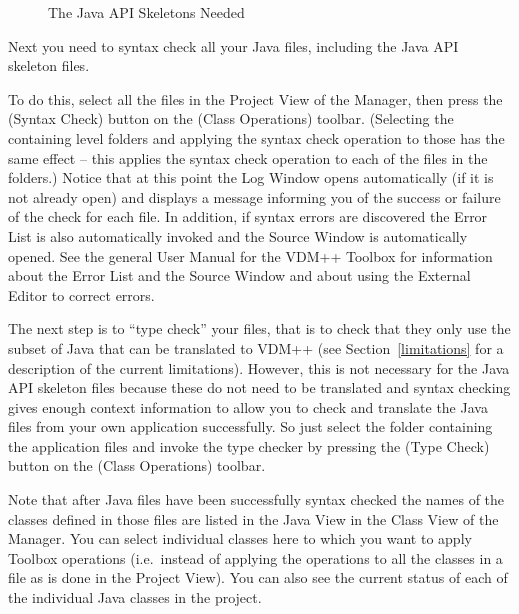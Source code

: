 \documentclass[\pformat,12pt]{article}
\newcommand{\guicmd}[1]{{\sf #1}}
\begin{document}
\begin{figure}[tbh]
\begin{center}
\caption{The Java API Skeletons Needed}\label{fig:javaLibFiles}
\end{center}
\end{figure}

Next you need to syntax check all your Java files, including the Java
API skeleton files. 

To do this, select all the files in the \guicmd{Project View} 
of the \guicmd{Manager}, then press the 
(\guicmd{Syntax Check}) button on the (\guicmd{Class Operations})
toolbar. (Selecting the containing level folders and
applying the syntax check operation to those  has the same effect --
this applies the syntax check operation to each of the  files in the folders.) 
Notice that at this point the \guicmd{Log Window} opens automatically
(if it is not already open) and displays a message informing you of
the success or failure of the check for each file. In addition, if
syntax errors are discovered the \guicmd{Error List} is
also au\-to\-matically invoked and the \guicmd{Source Window} is
automatically opened. See the general User Manual for the VDM++
Toolbox \cite{UserManPP-CSK} for information about the \guicmd{Error List}
and the \guicmd{Source Window} and about using the \guicmd{External
  Editor} to correct errors.

The next step is to ``type check'' your files, that is to check that
they only use the subset of Java 
that can be translated to VDM++ (see Section~\ref{limitations} for a
description of the current limitations). However, this is not
necessary for the Java API skeleton files because these do not need to
be translated and syntax checking gives enough context information to
allow you to check and translate the Java files from your own
application successfully. So just select the folder containing the
application files and invoke the type checker by pressing the 
(\guicmd{Type Check}) button on the (\guicmd{Class Operations})
toolbar. 

Note that after Java files have been successfully syntax checked the
names of the classes defined in those files are listed in the
\guicmd{Java View} in the \guicmd{Class View} of the
\guicmd{Manager}. You can select individual classes here to which you
want to apply Toolbox operations (i.e.\ instead of applying the
operations to all the classes in a file as is done in the
\guicmd{Project View}). You can also see the current status of each of
the individual Java classes in the project. 
\end{document}
